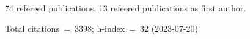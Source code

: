 74 refereed publications. 13 refeered publications as first author.

Total citations~=~3398; h-index~=~32 (2023-07-20)